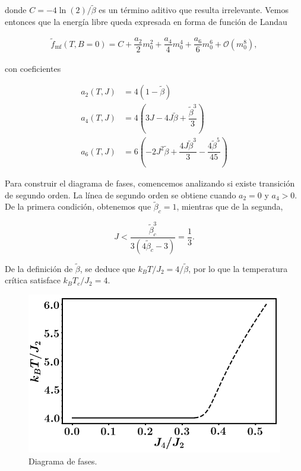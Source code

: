 \documentclass[10pt]{article}
\begin{document}
donde $C = -4\ln(2)/\tilde{\beta}$ es un t\'ermino aditivo que resulta irrelevante. Vemos entonces que la energ\'ia libre queda expresada en forma de funci\'on de Landau

\begin{align}
\tilde{f}_{\mathrm{mf}}(T,B=0) = C + \dfrac{a_2}{2} m_0^2 + 
\dfrac{a_4}{4} m_0^4 + \dfrac{a_6}{6} m_0^6 + \mathcal{O}(m_0^8),
\end{align}

con coeficientes 

\begin{align*}
a_2(T,J) &= 4 (1-\tilde{\beta})\\
a_4(T,J) &= 4\left( 3J - 4J\tilde{\beta} + \dfrac{\tilde{\beta}^3}{3} \right) \\
a_6(T,J) &= 6 \left(-2 J^2\tilde{\beta} + \dfrac{4J\tilde{\beta}^3}{3} - \dfrac{4\tilde{\beta}^5}{45}\right)
\end{align*}

Para construir el diagrama de fases, comencemos analizando si existe transici\'on de segundo orden. La l\'inea de segundo orden se obtiene cuando $a_2=0$ y $a_4>0$. De la primera condici\'on, obtenemos que $\tilde{\beta}_c = 1$, mientras que de la segunda,


\begin{equation}
J < \dfrac{\tilde{\beta}_c^3}{3(4\tilde{\beta}_c-3)}=\dfrac{1}{3}.
\end{equation}

De la definici\'on de $\tilde{\beta}$, se deduce que $k_B T/J_2 = 4 /\tilde{\beta}$, por lo que la temperatura cr\'itica satisface $k_B T_c/J_2 = 4$.

\begin{figure}
\centering
\includegraphics[scale=0.5]{phase_diagram.png}
\caption{Diagrama de fases.}
\end{figure}
\end{document}
